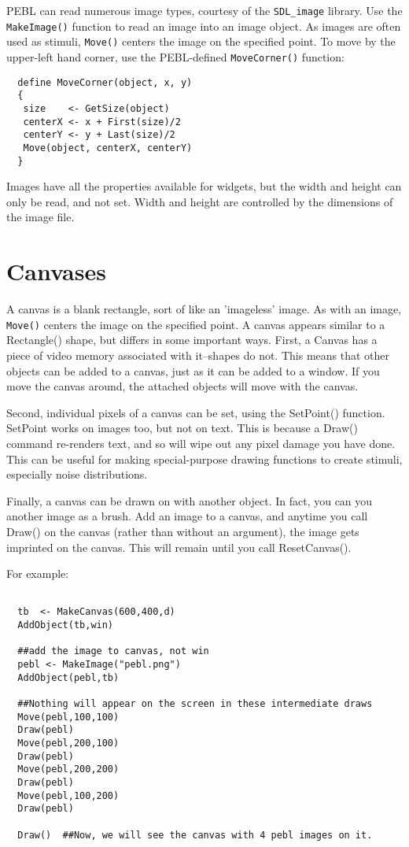 PEBL can read numerous image types, courtesy of the
\texttt{SDL\_image} library.  Use the \texttt{MakeImage()} function to
read an image into an image object.  As images are often used as
stimuli, \texttt{Move()} centers the image on the specified point.  To
move by the upper-left hand corner, use the PEBL-defined
\texttt{MoveCorner()} function:
\begin{verbatim}
  define MoveCorner(object, x, y)
  {
   size    <- GetSize(object)
   centerX <- x + First(size)/2
   centerY <- y + Last(size)/2
   Move(object, centerX, centerY)
  }
\end{verbatim}

Images have all the properties available for widgets, but the width
and height can only be read, and not set.  Width and height are
controlled by the dimensions of the image file.

\section{Canvases}

A canvas is a blank rectangle, sort of like an 'imageless' image. As
with an image, \texttt{Move()} centers the image on the specified
point. A canvas appears similar to a Rectangle() shape, but differs in
some important ways.  First, a Canvas has a piece of video memory
associated with it--shapes do not.  This means that other objects can
be added to a canvas, just as it can be added to a window.  If you
move the canvas around, the attached objects will move with the
canvas.  

Second, individual pixels of a canvas can be set, using the SetPoint()
function. SetPoint works on images too, but not on text.  This is
because a Draw() command re-renders text, and so will wipe out any
pixel damage you have done.  This can be useful for making
special-purpose drawing functions to create stimuli, especially noise
distributions.

Finally, a canvas can be drawn on with another object.  In fact, you can you
another image as a brush.  Add an image to a canvas, and anytime you
call Draw() on the canvas (rather than without an argument), the image
gets imprinted on the canvas.  This will remain until you call
ResetCanvas().

For example:
\begin{verbatim}

  tb  <- MakeCanvas(600,400,d)
  AddObject(tb,win)

  ##add the image to canvas, not win
  pebl <- MakeImage("pebl.png")
  AddObject(pebl,tb)

  ##Nothing will appear on the screen in these intermediate draws
  Move(pebl,100,100)
  Draw(pebl)
  Move(pebl,200,100)
  Draw(pebl)
  Move(pebl,200,200)
  Draw(pebl)
  Move(pebl,100,200)
  Draw(pebl)

  Draw()  ##Now, we will see the canvas with 4 pebl images on it.
\end{verbatim}


